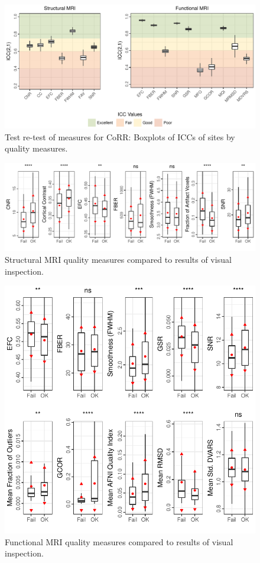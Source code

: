 \begin{figure}[!ht]
  \centering
      \includegraphics[]{data_analysis/icc_plot.pdf}
     \caption{Test re-test of measures for CoRR: Boxplots of ICCs of sites by quality measures.}
\end{figure}

\begin{figure}[!ht]
  \centering
    \includegraphics[]{data_analysis/abide_anat_qc}

  \caption{Structural MRI quality measures compared to results of visual inspection.}
\end{figure}

\begin{figure}[!ht]
  \centering
    \includegraphics[]{data_analysis/abide_func_qc}
    \caption{Functional MRI quality measures compared to results of visual inspection.}
  \end{figure}
